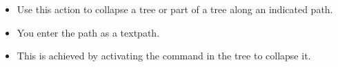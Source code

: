 \begin{itemize}
\item Use this action to collapse a tree or part of a tree along an indicated path.
\item You enter the path as a textpath.
\item This is achieved by activating the command in the tree to collapse it. 
\end{itemize}

  